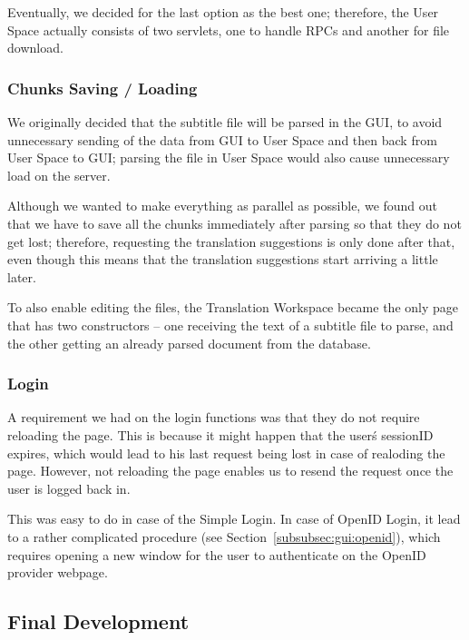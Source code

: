 Eventually, we decided for the last option as the best one; therefore, the User Space actually consists of two servlets, one to handle RPCs and another for file download.

\subsubsection{Chunks Saving / Loading}

We originally decided that the subtitle file will be parsed in the GUI, 
to avoid unnecessary sending of the data from GUI to User Space and then back from User Space to GUI; parsing the file in User Space would also cause unnecessary load on the server.

Although we wanted to make everything as parallel as possible, we found out that we have to save all the chunks immediately after parsing so that they do not get lost; therefore, requesting the translation suggestions is only done after that, even though this means that the translation suggestions start arriving a little later.

To also enable editing the files, the Translation Workspace became the only page that has two constructors -- one receiving the text of a subtitle file to parse, and the other getting an already parsed document from the database.

\subsubsection{Login}

A requirement we had on the login functions was that they do not require reloading the page. This is because it might happen that the user\'s sessionID expires, which would lead to his last request being lost in case of realoding the page. However, not reloading the page enables us to resend the request once the user is logged back in.

This was easy to do in case of the Simple Login. In case of OpenID Login, it lead to a rather complicated procedure (see Section~\ref{subsubsec:gui:openid}), which requires opening a new window for the user to authenticate on the OpenID provider webpage.

\subsection{Final Development}
\label{subsec:final_development}


